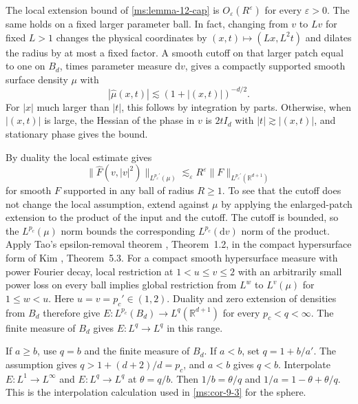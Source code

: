 The local extension bound of \ref{ms:lemma-12-cap} is $O_\varepsilon(R^\varepsilon)$ for every $\varepsilon>0$. The same holds on a fixed larger parameter ball. In fact, changing from $v$ to $Lv$ for fixed $L>1$ changes the physical coordinates by $(x,t)\mapsto (Lx,L^2t)$ and dilates the radius by at most a fixed factor. A smooth cutoff on that larger patch equal to one on $B_d$, times parameter measure $\mathrm dv$, gives a compactly supported smooth surface density $\mu$ with
\[
|\widehat\mu(x,t)|\lesssim (1+|(x,t)|)^{-d/2}.
\]
For $|x|$ much larger than $|t|$, this follows by integration by parts. Otherwise, when $|(x,t)|$ is large, the Hessian of the phase in $v$ is $2t I_d$ with $|t|\gtrsim |(x,t)|$, and stationary phase gives the bound.

By duality the local estimate gives
\[
\|\widehat F(v,|v|^2)\|_{L^{p_c'}(\mu)}
 \lesssim_\varepsilon R^\varepsilon\|F\|_{L^{p_c'}(\mathbb R^{d+1})}
\]
for smooth $F$ supported in any ball of radius $R\geq1$. To see that the cutoff does not change the local assumption, extend against $\mu$ by applying the enlarged-patch extension to the product of the input and the cutoff. The cutoff is bounded, so the $L^{p_c}(\mu)$ norm bounds the corresponding $L^{p_c}(\mathrm dv)$ norm of the product. Apply Tao's epsilon-removal theorem \cite{r-75}, Theorem~1.2, in the compact hypersurface form of Kim \cite{r-46}, Theorem~5.3. For a compact smooth hypersurface measure with power Fourier decay, local restriction at $1<u\leq v\leq 2$ with an arbitrarily small power loss on every ball implies global restriction from $L^w$ to $L^v(\mu)$ for $1\leq w<u$. Here $u=v=p_c'\in(1,2)$. Duality and zero extension of densities from $B_d$ therefore give $E:L^{p_c}(B_d)\to L^q(\mathbb R^{d+1})$ for every $p_c<q<\infty$. The finite measure of $B_d$ gives $E:L^q\to L^q$ in this range.

If $a\geq b$, use $q=b$ and the finite measure of $B_d$. If $a<b$, set $q=1+b/a'$. The assumption gives $q>1+(d+2)/d=p_c$, and $a<b$ gives $q<b$. Interpolate $E:L^1\to L^\infty$ and $E:L^q\to L^q$ at $\theta=q/b$. Then $1/b=\theta/q$ and $1/a=1-\theta+\theta/q$. This is the interpolation calculation used in \ref{ms:cor-9-3} for the sphere.
